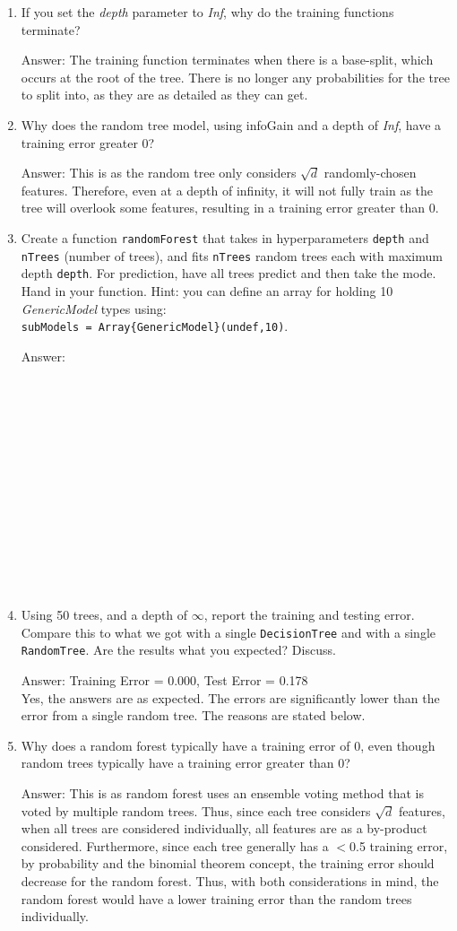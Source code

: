 \documentclass{article}
\def\ans#1{\par\gre{Answer: #1}}
\def\blu#1{{\color{blu}#1}}
\def\gre#1{{\color{gre}#1}}
\def\enum#1{\begin{enumerate}#1\end{enumerate}}
\begin{document}
\blu{
\enum{
\item If you set the \emph{depth} parameter to \emph{Inf}, why do the training functions terminate?
\ans{The training function terminates when there is a base-split, which occurs at the root of the tree. There is no longer any probabilities for the tree to split into, as they are as detailed as they can get.}
\item Why does the random tree model, using infoGain and a depth of \emph{Inf}, have a training error greater 0?
\ans{This is as the random tree only considers $\sqrt{d}$ randomly-chosen features. Therefore, even at a depth of infinity, it will not fully train as the tree will overlook some features, resulting in a training error greater than 0. }
\item Create a function \texttt{randomForest} that takes in hyperparameters \texttt{depth} and \texttt{nTrees} (number of trees), and
fits \texttt{nTrees} random trees each with maximum depth \texttt{depth}. For prediction, have all trees predict and then take the mode. Hand in your function. Hint: you can define an array for holding 10 \emph{GenericModel} types using:\\
\texttt{subModels = Array\{GenericModel\}(undef,10)}.
\ans{
\\
\\
\\
\\
\\
\\
\\
\\
\\
\\
\\
\\
\\
\\}
\item Using 50 trees, and a depth of $\infty$, report the training and testing error. Compare this to what we got with a single \texttt{DecisionTree} and with a single \texttt{RandomTree}. Are the results what you expected? Discuss.
\ans{Training Error = 0.000, Test Error = 0.178 \\
Yes, the answers are as expected. The errors are significantly lower than the error from a single random tree. The reasons are stated below.}
\item Why does a random forest typically have a training error of 0, even though random trees typically have a training error greater than 0?
\ans{This is as random forest uses an ensemble voting method that is voted by multiple random trees. Thus, since each tree considers $\sqrt{d}$ features, when all trees are considered individually, all features are as a by-product considered. Furthermore, since each tree generally has a $<$0.5 training error, by probability and the binomial theorem concept, the training error should decrease for the random forest. Thus, with both considerations in mind, the random forest would have a lower training error than the random trees individually.}
}
}
\end{document}
